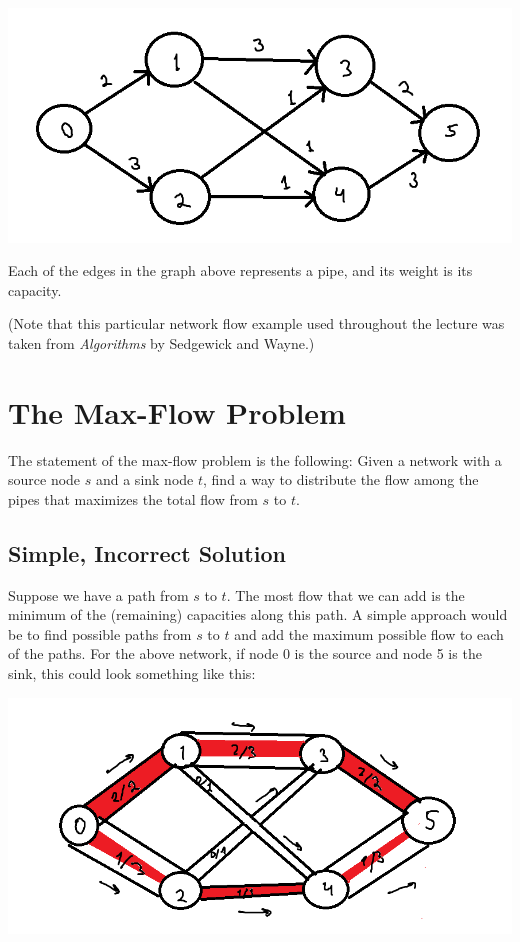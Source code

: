 \documentclass[12pt, letterpaper]{article}
\begin{document}
\includegraphics[scale=0.5]{figure2.png}

Each of the edges in the graph above represents a pipe, and its weight is its capacity.

(Note that this particular network flow example used throughout the lecture was taken from \textit{Algorithms} by Sedgewick and Wayne.)

\section{The Max-Flow Problem}
The statement of the max-flow problem is the following: Given a network with a source node $s$ and a sink node $t$, find a way to distribute the flow among the pipes that maximizes the total flow from $s$ to $t$.

\subsection{Simple, Incorrect Solution}
Suppose we have a path from $s$ to $t$. The most flow that we can add is the minimum of the (remaining) capacities along this path. A simple approach would be to find possible paths from $s$ to $t$ and add the maximum possible flow to each of the paths. For the above network, if node 0 is the source and node 5 is the sink, this could look something like this:

\includegraphics[scale=0.75]{figure3.png}
\end{document}
